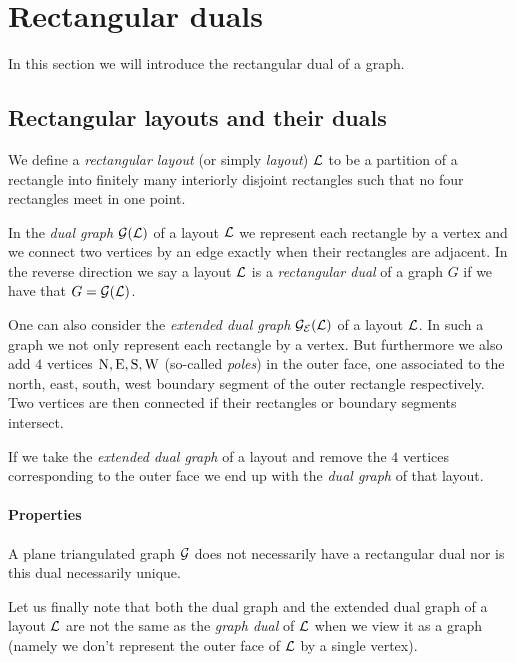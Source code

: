 
\section{Rectangular duals}
\newcommand{\G}{\scr G}
\renewcommand{\L}{\scr L}

In this section we will introduce the rectangular dual of a graph.

\subsection{Rectangular layouts and their duals}
  We define a \emph{rectangular layout} (or simply \emph{layout}) $\L$ to be a partition of a rectangle into finitely many interiorly disjoint rectangles such that no four rectangles meet in one point.

  In the \emph{dual graph} $\dualgraph{\L}$ of a layout $\L$ we represent each rectangle by a vertex and we connect two vertices by an edge exactly when their rectangles are adjacent. In the reverse direction we say a layout $\L$ is a \emph{rectangular dual} of a graph $G$ if we have that $G = \dualgraph{\L}$.


  One can also consider the \emph{extended dual graph} $\extdualgraph{\L}$ of a layout $\L$. In such a graph we not only represent each rectangle by a vertex. But furthermore we also add $4$ vertices $\mathrm{N}, \mathrm{E}, \mathrm{S}, \mathrm{W}$ (so-called \emph{poles}) in the outer face, one associated to the north, east, south, west boundary segment of the outer rectangle respectively. Two vertices are then connected if their rectangles or boundary segments intersect.

  If we take the \emph{extended dual graph} of a layout and remove the $4$ vertices corresponding to the outer face we end up with the \emph{dual graph} of that layout.


  \paragraph{Properties}
  A plane triangulated graph $\G$ does not necessarily have a rectangular dual nor is this dual necessarily unique.

  Let us finally note that both the dual graph and the extended dual graph of a layout $\L$ are not the same as the \emph{graph dual} of $\L$ when we view it as a graph (namely we don't represent the outer face of $\L$ by a single vertex).



